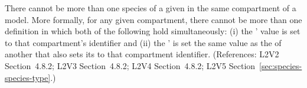 There cannot be more than one species of a given \SpeciesType in the same
compartment of a model.  More formally, for any given compartment, there
cannot be more than one \Species definition in which both of the following
hold simultaneously: (i) the \Species'  value is set to
that compartment's identifier and (ii) the \Species'  is
set the same value as the  of another \Species that also
sets its  to that compartment identifier.  (References:
L2V2 Section~4.8.2; L2V3 Section~4.8.2; L2V4 Section~4.8.2; L2V5 Section~\ref{sec:species-species-type}.)
